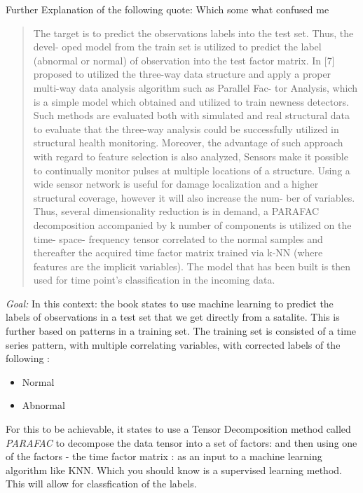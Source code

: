 \documentclass{article}
\theoremstyle{mytheoremstyle}
\theoremstyle{mytheoremstyle}
\theoremstyle{myproblemstyle}
\begin{document}
Further Explanation of the following quote: Which some what confused me
\begin{quote}
	The target is to predict the observations labels into the test set. Thus, the devel-
	oped model from the train set is utilized to predict the label (abnormal or normal) of
	observation into the test factor matrix. In [7] proposed to utilized the three-way data
	structure and apply a proper multi-way data analysis algorithm such as Parallel Fac-
	tor Analysis, which is a simple model which obtained and utilized to train newness
	detectors. Such methods are evaluated both with simulated and real structural data
	to evaluate that the three-way analysis could be successfully utilized in structural
	health monitoring. Moreover, the advantage of such approach with regard to feature
	selection is also analyzed, Sensors make it possible to continually monitor pulses at
	multiple locations of a structure. Using a wide sensor network is useful for damage
	localization and a higher structural coverage, however it will also increase the num-
	ber of variables. Thus, several dimensionality reduction is in demand, a PARAFAC
	decomposition accompanied by k number of components is utilized on the time-
	space- frequency tensor correlated to the normal samples and thereafter the acquired
	time factor matrix trained via k-NN (where features are the implicit variables). The
	model that has been built is then used for time point’s classification in the incoming
	data.
\end{quote}

\textit{Goal: }In this context: the book states to use machine learning to predict the labels of observations in a test set that we get directly from a satalite. This is further based on patterns in a training set. The training set is consisted of a time series pattern, with multiple correlating variables, with corrected labels of the following :
\begin{itemize}
	\item Normal
	\item Abnormal
\end{itemize}

For this to be achievable, it states to use a Tensor Decomposition method called
\textit{PARAFAC} to decompose the data tensor into a set of factors: and then using one of the factors - the time factor matrix : as an input to a machine learning algorithm like KNN. Which you should know is a supervised learning method. This will allow for classfication of the labels.
\end{document}
